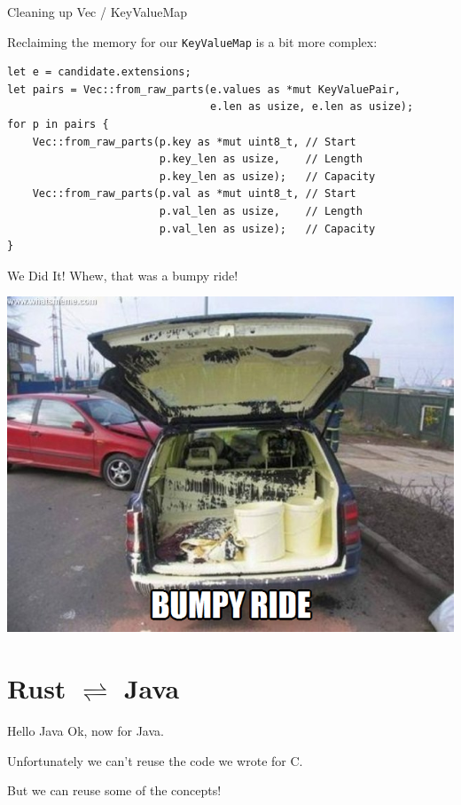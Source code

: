 \documentclass[aspectratio=1610,14pt,t]{beamer}
\begin{document}
\begin{frame}[c,fragile]{Cleaning up Vec / KeyValueMap}

  Reclaiming the memory for our \texttt{KeyValueMap} is a bit more complex:

  \begin{verbatim}
let e = candidate.extensions;
let pairs = Vec::from_raw_parts(e.values as *mut KeyValuePair,
                                e.len as usize, e.len as usize);
for p in pairs {
    Vec::from_raw_parts(p.key as *mut uint8_t, // Start
                        p.key_len as usize,    // Length
                        p.key_len as usize);   // Capacity
    Vec::from_raw_parts(p.val as *mut uint8_t, // Start
                        p.val_len as usize,    // Length
                        p.val_len as usize);   // Capacity
}
  \end{verbatim}
\end{frame}

\begin{frame}[c]{We Did It!}
  \centering
  Whew, that was a bumpy ride!

  \includegraphics[width=.6\textwidth]{img/bump.png}
\end{frame}


\section{Rust $\rightleftharpoons$ Java}

\begin{frame}[c]{Hello Java}
  Ok, now for Java.

  Unfortunately we can't reuse the code we wrote for C.

  But we can reuse some of the concepts!
\end{frame}
\end{document}
